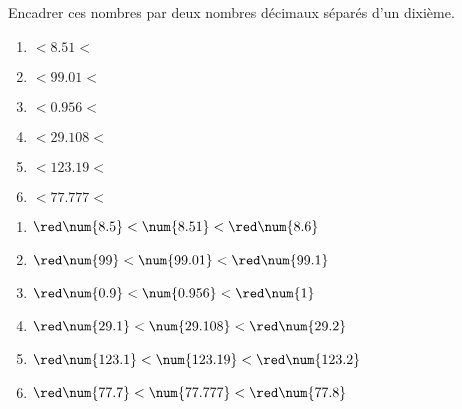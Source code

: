 \begin{exercice}
    Encadrer ces nombres par deux nombres décimaux séparés d'un dixième.
    \begin{multicols}{2}
        \begin{enumerate}
            \item \makebox[0.2\linewidth]{\dotfill}$<\num{8.51  }<$ \makebox[0.2\linewidth]{\dotfill}
            \item \makebox[0.2\linewidth]{\dotfill}$<\num{99.01 }<$ \makebox[0.2\linewidth]{\dotfill}
            \item \makebox[0.2\linewidth]{\dotfill}$<\num{0.956 }<$ \makebox[0.2\linewidth]{\dotfill}
            \item \makebox[0.2\linewidth]{\dotfill}$<\num{29.108}<$ \makebox[0.2\linewidth]{\dotfill}
            \item \makebox[0.2\linewidth]{\dotfill}$<\num{123.19}<$ \makebox[0.2\linewidth]{\dotfill}
            \item \makebox[0.2\linewidth]{\dotfill}$<\num{77.777}<$ \makebox[0.2\linewidth]{\dotfill}
        \end{enumerate}
    \end{multicols}
\end{exercice} 
\begin{corrige}
    \phantom{rrr}

    \begin{enumerate}
        \item ${\red\num{8.5  }} < \num{8.51  } < {\red \num{8.6  }}$
        \item ${\red\num{99   }} < \num{99.01 } < {\red \num{99.1 }}$
        \item ${\red\num{0.9  }} < \num{0.956 } < {\red \num{1    }}$
        \item ${\red\num{29.1 }} < \num{29.108} < {\red \num{29.2 }}$
        \item ${\red\num{123.1}} < \num{123.19} < {\red \num{123.2}}$
        \item ${\red\num{77.7 }} < \num{77.777} < {\red \num{77.8 }}$
    \end{enumerate}
\end{corrige}